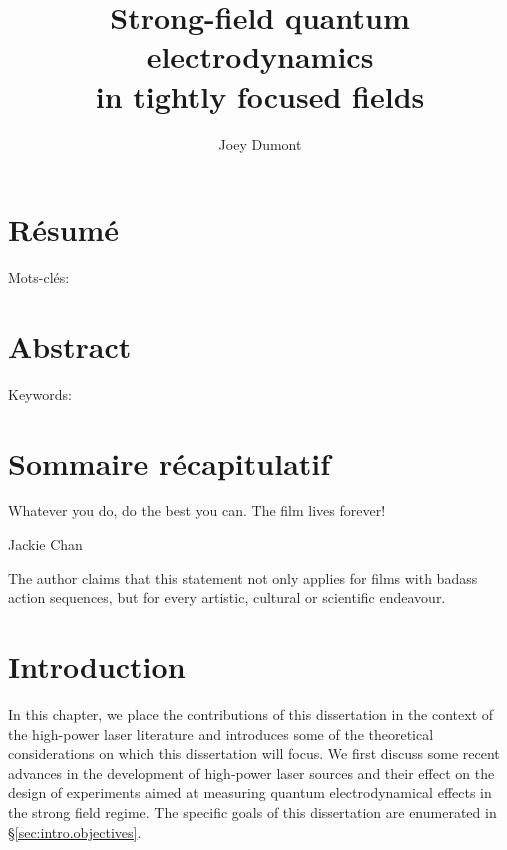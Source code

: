 \documentclass[11pt,SymmetricalJury]{inrsthesis/inrsthesis}
\title{Strong-field quantum electrodynamics \\ in tightly focused fields}
\author{Joey Dumont}
\begin{document}
\frontmatter

\maketitle

\chapter{Résumé}

Mots-clés:

\chapter{Abstract}

Keywords:

\chapter{Sommaire récapitulatif}
\cleardoublepage

\tableofcontents
\cleardoublepage

\listoftables
\cleardoublepage

\listoffigures
\cleardoublepage

\dedication{To my wife and son.}
\cleardoublepage

\epigraph{Whatever you do, do the best you can. The film lives forever!}{Jackie Chan}

\begin{flushright}
\begin{minipage}{0.35\textwidth}
The author claims that this statement not only applies for films with badass
action sequences, but for every artistic, cultural or scientific endeavour.
\end{minipage}
\end{flushright}

\cleardoublepage

\mainmatter

\chapter{Introduction}

In this chapter, we place the contributions of this dissertation in the context
of the high-power laser literature and introduces some of the theoretical
considerations on which this dissertation will focus. We first discuss some
recent advances in the development of high-power laser sources and their effect
on the design of experiments aimed at measuring quantum electrodynamical
effects in the strong field regime. The specific goals of this dissertation are
enumerated in \S\ref{sec:intro.objectives}.
\end{document}
